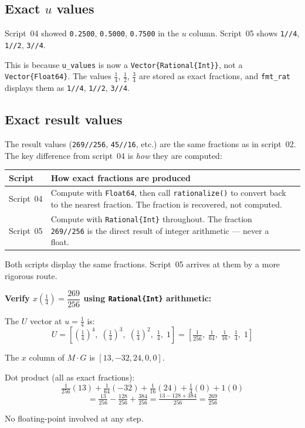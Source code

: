 \documentclass[12pt, a4paper]{article}
\newcommand{\cd}[1]{\texttt{#1}}
\begin{document}
\subsection{Exact $u$ values}

Script~04 showed \cd{0.2500}, \cd{0.5000}, \cd{0.7500}
in the $u$ column.
Script~05 shows \cd{1//4}, \cd{1//2}, \cd{3//4}.

This is because \cd{u\_values} is now a
\cd{Vector\{Rational\{Int\}\}}, not a \cd{Vector\{Float64\}}.
The values $\tfrac{1}{4}$, $\tfrac{1}{2}$, $\tfrac{3}{4}$
are stored as exact fractions, and \cd{fmt\_rat} displays them
as \cd{1//4}, \cd{1//2}, \cd{3//4}.

\subsection{Exact result values}

The result values (\cd{269//256}, \cd{45//16}, etc.) are
the same fractions as in script~02.
The key difference from script~04 is \emph{how} they are
computed:

\begin{center}
\begin{tabular}{lp{5cm}p{5cm}}
\toprule
Script & How exact fractions are produced \\
\midrule
Script~04 &
  Compute with \cd{Float64}, then call \cd{rationalize()} to
  convert back to the nearest fraction.
  The fraction is recovered, not computed. \\[6pt]
Script~05 &
  Compute with \cd{Rational\{Int\}} throughout.
  The fraction \cd{269//256} is the direct result of
  integer arithmetic --- never a float. \\
\bottomrule
\end{tabular}
\end{center}

Both scripts display the same fractions.
Script~05 arrives at them by a more rigorous route.

\begin{examplebox}
\textbf{Verify $x\!\left(\tfrac{1}{4}\right) = \dfrac{269}{256}$
using \cd{Rational\{Int\}} arithmetic:}

The $U$ vector at $u = \tfrac{1}{4}$ is:
\[
  U = \left[\left(\tfrac{1}{4}\right)^4,\;
            \left(\tfrac{1}{4}\right)^3,\;
            \left(\tfrac{1}{4}\right)^2,\;
            \tfrac{1}{4},\; 1\right]
  = \left[\tfrac{1}{256},\; \tfrac{1}{64},\;
          \tfrac{1}{16},\; \tfrac{1}{4},\; 1\right]
\]

The $x$ column of $M \cdot G$ is $[13, -32, 24, 0, 0]$.

Dot product (all as exact fractions):
\[
  \tfrac{1}{256}(13) + \tfrac{1}{64}(-32) + \tfrac{1}{16}(24)
  + \tfrac{1}{4}(0) + 1(0)
\]
\[
  = \tfrac{13}{256} - \tfrac{128}{256} + \tfrac{384}{256}
  = \tfrac{13 - 128 + 384}{256}
  = \tfrac{269}{256}
\]

No floating-point involved at any step. \checkmark
\end{examplebox}
\end{document}
